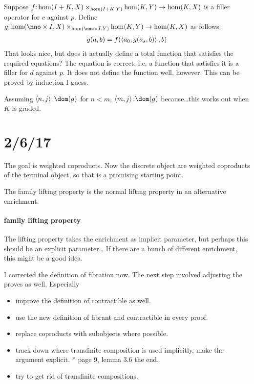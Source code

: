 \documentclass[csh.tex]{subfiles}
\begin{document}
Suppose $f\mathord : \hom(I+K,X)\times_{\hom(I+K,Y)}\hom(K,Y) \to \hom(K,X)$ is a filler operator for $c$ against $p$.
Define $g\of\hom(\nno\times I,X)\times_{\hom(\nno \times I,Y)}\hom(K,Y) \to \hom(K,X)$ as follows:
\begin{align*}
g(a,b) &= f(\left\langle a_0,g(a_s,b) \right\rangle,b)\\
\end{align*}
That looks nice, but does it actually define a total function that satisfies the required equations?
The equation is correct, i.e. a function that satisfies it is a filler for $d$ against $p$. It does not define the function well, however.
This can be proved by induction I guess.

Assuming $\tuplet{n,j}\of\dom(g)$ for $n < m$, $\tuplet{m,j}\of\dom(g)$ because\dots this works out when $K$ is graded.

\section{2/6/17}
The goal is weighted coproducts. Now the discrete object are weighted coproducts of the terminal object, so that is a promising starting point.


The family lifting property is the normal lifting property in an alternative enrichment.

\paragraph{family lifting property}
The lifting property takes the enrichment as implicit parameter, but perhaps this should be an explicit parameter\dots
If there are a bunch of different enrichment, this might be a good idea.


I corrected the definition of fibration now. The next step involved adjusting the proves as well,
Especially 

\begin{itemize}
\item improve the definition of contractible as well.
\item use the new definition of fibrant and contractible in every proof.
\item replace coproducts with subobjects where possible.
\item track down where transfinite composition is used implicitly, make the argument explicit.
  * page 9, lemma 3.6 the end.	
\item try to get rid of transfinite compositions.
\end{itemize}
\end{document}

